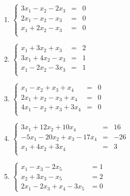 \begin{prob}
\begin{multicols}{2}
\begin{enumerate}[$a)$]
	\item $\left\lbrace \begin{array}{ccc}
	3x_1-x_2-2x_3&=&0\\
2x_1-x_2-x_3&=&0\\
x_1+2x_2-x_3&=&0\\
	\end{array} \right. $
	
	
		\item $\left\lbrace \begin{array}{ccc}
	x_1+3x_2+x_3&=&2\\
	3x_1+4x_2-x_3&=&1\\
	x_1-2x_2-3x_3&=&1\\
	\end{array} \right. $
	
	\item $\left\lbrace \begin{array}{ccc}
	x_1-x_2+x_3+x_4&=&0\\
	2x_1+x_2-x_3+x_4&=&0\\
	4x_1-x_2+x_3+3x_4&=&0\\
	\end{array} \right. $
	
		\item $\left\lbrace \begin{array}{ccc}
	3x_1+12x_2+10x_4&=&16\\
	-5x_1-20x_2+x_3-17x_4&=&-26\\
	x_1+4x_2+3x_4&=&3\\
	\end{array} \right. $

	
	\item $\left\lbrace \begin{array}{cc}
x_1 -x_3 -2x_5&=1 \\ 
   x_2+3x_3-x_5 &=2 \\ 
   2x_1 -2x_3 +x_4 -3x_5 &= 0 
\end{array} \right.$
\end{enumerate}
\end{multicols}
\end{prob}

